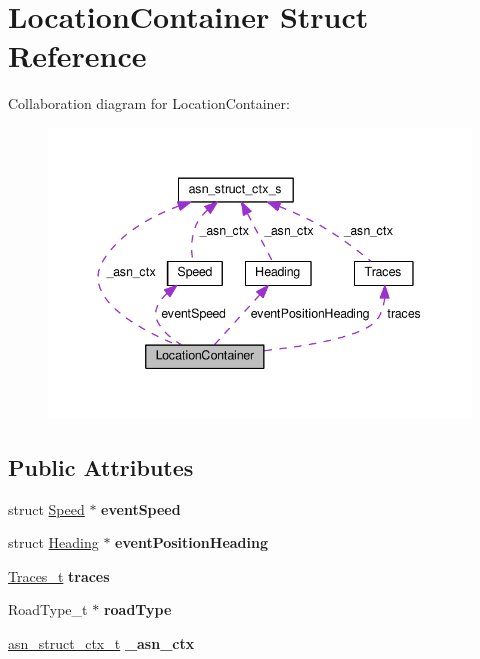 \hypertarget{structLocationContainer}{}\section{Location\+Container Struct Reference}
\label{structLocationContainer}


Collaboration diagram for Location\+Container\+:\nopagebreak
\begin{figure}[H]
\begin{center}
\leavevmode
\includegraphics[width=341pt]{structLocationContainer__coll__graph}
\end{center}
\end{figure}
\subsection*{Public Attributes}
\begin{DoxyCompactItemize}
\item 
struct \hyperlink{structSpeed}{Speed} $\ast$ {\bfseries event\+Speed}\hypertarget{structLocationContainer_ae361766a7751f128f8c8caa528c51fae}{}\label{structLocationContainer_ae361766a7751f128f8c8caa528c51fae}

\item 
struct \hyperlink{structHeading}{Heading} $\ast$ {\bfseries event\+Position\+Heading}\hypertarget{structLocationContainer_af8846750f7f6fd50a43775c2b81f9d12}{}\label{structLocationContainer_af8846750f7f6fd50a43775c2b81f9d12}

\item 
\hyperlink{structTraces}{Traces\+\_\+t} {\bfseries traces}\hypertarget{structLocationContainer_a96a7749c7f46d19d0f7e19e6b1b035b9}{}\label{structLocationContainer_a96a7749c7f46d19d0f7e19e6b1b035b9}

\item 
Road\+Type\+\_\+t $\ast$ {\bfseries road\+Type}\hypertarget{structLocationContainer_a93ac9d39593dc848537980b5185efe67}{}\label{structLocationContainer_a93ac9d39593dc848537980b5185efe67}

\item 
\hyperlink{structasn__struct__ctx__s}{asn\+\_\+struct\+\_\+ctx\+\_\+t} {\bfseries \+\_\+asn\+\_\+ctx}\hypertarget{structLocationContainer_a21991ca814766bdabd964d93cb15949b}{}\label{structLocationContainer_a21991ca814766bdabd964d93cb15949b}

\end{DoxyCompactItemize}


